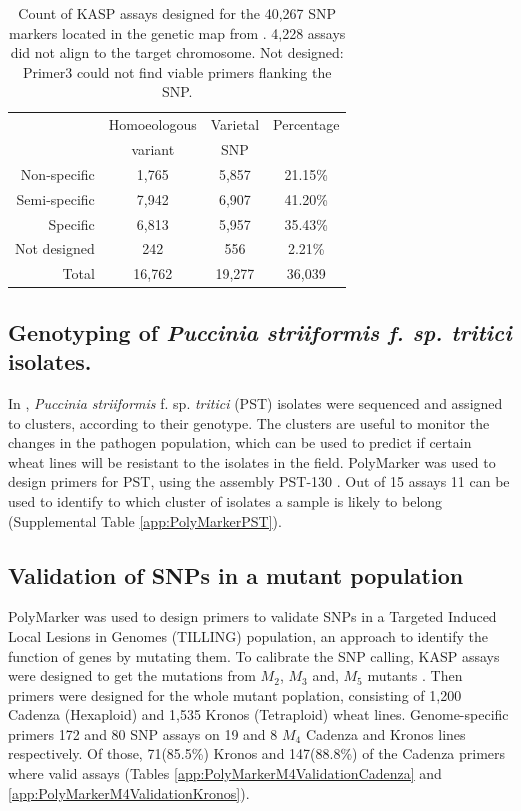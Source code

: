 \begin{table}

\centering
\caption{Count of KASP assays designed for the 40,267 SNP markers located in the genetic map from \cite{Wang2014}. 4,228 assays did not align to the target chromosome. \label{tab:poly:designed} Not designed: Primer3 could not find viable primers flanking the SNP.}

\begin{tabular}{rccc}

\toprule
 & Homoeologous  &     Varietal  & Percentage\\
  &  variant &      SNP & \\
 \midrule
Non-specific&1,765&5,857&21.15\%\\
Semi-specific&7,942&6,907&41.20\%\\
Specific&6,813&5,957&35.43\%\\
Not designed &242&556&2.21\%\\
\midrule
 Total&16,762&19,277&36,039\\
\bottomrule
\end{tabular}

\end{table}

\subsection{Genotyping of \textit{Puccinia 
striiformis f. sp. tritici} isolates.}
In \cite{Hubbard2015}, \textit{Puccinia striiformis} f. sp. \textit{tritici} (PST) isolates were sequenced and assigned to clusters, according to their genotype.
The clusters are useful to monitor the changes in the pathogen population, which can be used to predict if certain wheat lines will be resistant to the isolates in the field. 
PolyMarker was used to design primers for PST, using the assembly PST-130 \cite{Cantu2011}.
Out of 15 assays 11 can be used to identify to which cluster of isolates a sample is likely to belong (Supplemental Table \ref{app:PolyMarkerPST}).  

\subsection{Validation of SNPs in a mutant population}

PolyMarker was used to design primers to validate SNPs in a Targeted Induced Local Lesions in Genomes (TILLING) population, an approach to identify the function of genes by mutating them. 
To calibrate the SNP calling, KASP assays were designed to get the mutations from $M_{2}$, $M_{3}$ and, $M_{5}$ mutants \cite{King2015}. 
Then primers were designed for the whole mutant poplation, consisting of 1,200 Cadenza (Hexaploid) and 1,535 Kronos (Tetraploid) wheat lines\cite{Krasileva2016}. Genome-specific primers  172 and 80 SNP assays on 19 and 8 $M_{4}$ Cadenza and Kronos lines respectively. 
Of those, 71(85.5\%) Kronos and 147(88.8\%) of the Cadenza primers where valid assays (Tables \ref{app:PolyMarkerM4ValidationCadenza} and \ref{app:PolyMarkerM4ValidationKronos}).  



